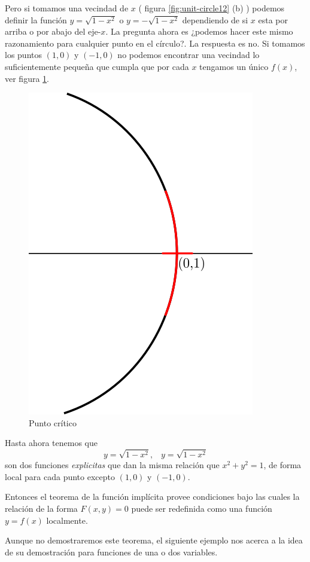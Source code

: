 \begin{example}
    Pero si tomamos una vecindad de $x$ ( figura \ref{fig:unit-circle12} (b) )
    podemos definir la funci\'on $y = \sqrt{1-x^{2}}$ o $y = -\sqrt{1-x^{2}}$
    dependiendo de si $x$ esta por arriba o por abajo del eje-$x$. La
    pregunta ahora es ¿podemos hacer este mismo razonamiento para cualquier
    punto en el c\'irculo?. La respuesta es no. Si tomamos los puntos
    $(1,0)$ y $(-1,0)$ no podemos encontrar una vecindad lo suficientemente
    pequeña que cumpla que por cada $x$ tengamos un \'unico $f(x)$, ver
    figura \ref{fig:unit-circle3}.

    \begin{figure}[ht]
      \begin{center}
      \includegraphics[width=0.5\linewidth]{gfx/unit-circle3}
        \caption{Punto cr\'itico}
      \label{fig:unit-circle3}
      \end{center}
    \end{figure}

    Hasta ahora tenemos que
    $$y = \sqrt{1-x^{2}} \text{,} \quad y = \sqrt{1-x^{2}}$$
    son dos funciones \emph{explicitas} que dan la misma relaci\'on que
    $x^{2} + y^{2} = 1$, de forma local para cada punto excepto 
    $(1,0)$ y $(-1,0)$.

    Entonces el teorema de la funci\'on impl\'icita provee condiciones
    bajo las cuales la relaci\'on de la forma $F(x,y)=0$ puede ser
    redefinida como una funci\'on $y=f(x)$ localmente.
\end{example}

Aunque no demostraremos este teorema, el siguiente ejemplo nos acerca a la
idea de su demostraci\'on para funciones de una o dos variables.

